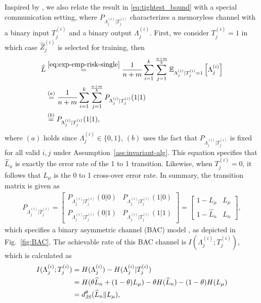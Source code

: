 \documentclass[onecolumn,romanappendices,10pt]{IEEEtran}
\newcommand{\EE}{{\mathbb{E}}}
\begin{document}
	Inspired by \cite{wang2023tighter}, we also relate the result in \eqref{eq:tightest_bound} with a special communication setting, where $P_{\Lambda^{(i)}_j | T^{(i)}_j}$ characterizes a memoryless channel with a binary input $T^{(i)}_j$ and a binary output $\Lambda^{(i)}_j$. First, we consider $T^{(i)}_j = 1$ in which case $\hat{Z}^{(i)}_j$ is selected for training, then 
	\begin{equation}
		\begin{aligned}
			\widehat{L} &\overset{\eqref{eq:exp-emp-risk-single}}{=} \frac{1}{n+m} \sum_{i=1}^{k}\sum_{j=1}^{\frac{n+m}{k}} \EE_{\Lambda^{(i)}_j | T^{(i)}_j=1} \left[ \Lambda^{(i)}_j \right] \\
			&\overset{(a)}{=} \frac{1}{n+m} \sum_{i=1}^{k}\sum_{j=1}^{\frac{n+m}{k}} P_{\Lambda^{(i)}_j | T^{(i)}_j} (1|1) \\
			&\overset{(b)}{=} P_{\Lambda^{(i)}_j | T^{(i)}_j} (1|1),
		\end{aligned}
	\end{equation}
	where $(a)$ holds since $\Lambda^{(i)}_j \in \{0,1\}$, $(b)$ uses the fact that $P_{\Lambda^{(i)}_j | T^{(i)}_j}$ is fixed for all valid $i,j$ under Assumption~\ref{ass:invariant-alg}. This equation specifies that $\widehat{L}_n$ is exactly the error rate of the 1 to 1 transition. Likewise, when $T^{(i)}_j = 0$, it follows that $L_\mu$ is the 0 to 1 cross-over error rate. In summary, the transition matrix is given as
	\begin{equation}
		\begin{aligned}
			P_{\Lambda^{(i)}_j | T^{(i)}_j} = \begin{bmatrix} P_{\Lambda^{(i)}_j | T^{(i)}_j}(0|0) & P_{\Lambda^{(i)}_j | T^{(i)}_j}(1|0) \\ P_{\Lambda^{(i)}_j | T^{(i)}_j}(0|1) & P_{\Lambda^{(i)}_j | T^{(i)}_j}(1|1) \end{bmatrix} = \begin{bmatrix} 1-L_\mu & L_\mu \\ 1-\widehat{L}_n & \widehat{L}_n \end{bmatrix},
		\end{aligned}
	\end{equation}
	which specifies a binary asymmetric channel (BAC) model \cite{moser2009error}, as depicted in Fig.~\ref{fig:BAC}. The achievable rate of this BAC channel is $I(\Lambda^{(i)}_j; T^{(i)}_j)$, which is calculated as
	\begin{equation}
		\begin{aligned}
			I(\Lambda^{(i)}_j; T^{(i)}_j) &= H(\Lambda^{(i)}_j) - H(\Lambda^{(i)}_j | T^{(i)}_j) \\
			&= H(\theta \widehat{L}_n + (1-\theta) L_\mu) - \theta H(\widehat{L}_n) - (1-\theta) H(L_\mu) \\
			&= d^\theta_{\textnormal{JS}} ( \widehat{L}_n \| L_\mu ),
		\end{aligned}
	\end{equation}
\end{document}
